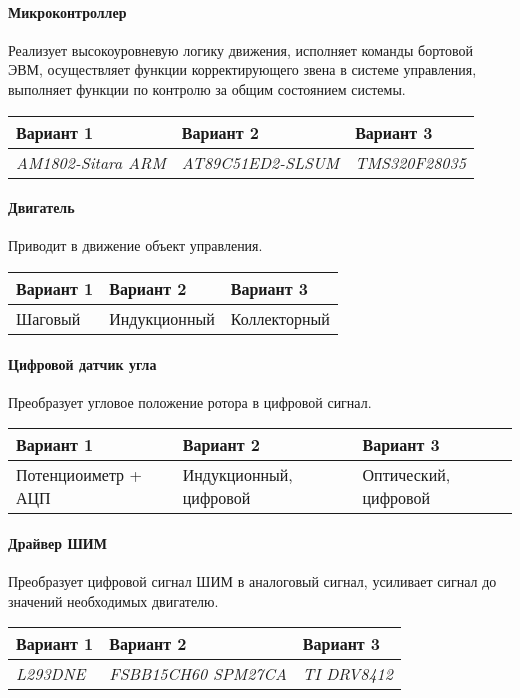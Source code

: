 \paragraph{Микроконтроллер}
Реализует высокоуровневую логику движения, исполняет команды бортовой ЭВМ,
осуществляет функции корректирующего звена в системе управления, выполняет
функции по контролю за общим состоянием системы.

\begin{tabular}{|p{5cm}|p{5cm}|p{5cm}|}
    \hline
    Вариант 1 & Вариант 2 & Вариант 3 \\
    \hline
    \textit{AM1802-Sitara ARM} &
    \textit{AT89C51ED2-SLSUM} &
    \textit{TMS320F28035} \\
    \hline
\end{tabular}

\paragraph{Двигатель}
Приводит в движение объект управления.

\begin{tabular}{|p{5cm}|p{5cm}|p{5cm}|}
    \hline
    Вариант 1 & Вариант 2 & Вариант 3 \\
    \hline
    Шаговый &
    Индукционный &
    Коллекторный \\
    \hline
\end{tabular}

\paragraph{Цифровой датчик угла}
Преобразует угловое положение ротора в цифровой сигнал.

\begin{tabular}{|p{5cm}|p{5cm}|p{5cm}|}
    \hline
    Вариант 1 & Вариант 2 & Вариант 3 \\
    \hline
    Потенциоиметр + АЦП &
    Индукционный, цифровой &
    Оптический, цифровой \\
    \hline
\end{tabular}

\paragraph{Драйвер ШИМ}
Преобразует цифровой сигнал ШИМ в аналоговый сигнал,
усиливает сигнал до значений необходимых двигателю.

\begin{tabular}{|p{5cm}|p{5cm}|p{5cm}|}
    \hline
    Вариант 1 & Вариант 2 & Вариант 3 \\
    \hline
    \textit{L293DNE} &
    \textit{FSBB15CH60 SPM27CA} &
    \textit{TI DRV8412} \\
    \hline
\end{tabular}

